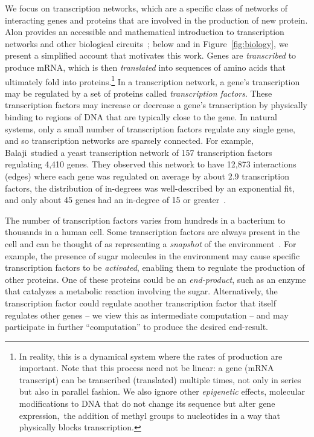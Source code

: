 \documentclass[11pt]{article}
\begin{document}
We focus on transcription networks, which are a specific class of networks of
interacting genes and proteins that are involved in the production of new
protein. Alon provides an accessible and mathematical introduction to
transcription networks and other biological circuits~\cite{Alon:2006}; below and
in Figure~\ref{fig:biology}, we present a simplified account that motivates this
work. Genes are \emph{transcribed} to produce mRNA, which is then
\emph{translated} into sequences of amino acids that ultimately fold into
proteins.\footnote{In reality, this is a dynamical system where the rates of
production are important. Note that this process need not be linear: a gene (mRNA
transcript) can be transcribed (translated) multiple times, not only in series
but also in parallel fashion.  We also ignore
other \emph{epigenetic} effects, \ie molecular modifications to DNA that do not
change its sequence but alter gene expression,~\eg the addition of methyl groups
to nucleotides in a way that physically blocks transcription.}
In a transcription network, a gene's transcription may be regulated by a set of
proteins called \emph{transcription factors}.
These transcription factors may increase or decrease a gene's transcription by
physically binding to regions of DNA that are typically close to the gene.
In natural systems, only a small number of transcription factors
regulate any single gene, and so transcription networks are sparsely connected.
For example, Balaji~\etal studied a yeast
transcription network of 157 transcription factors regulating 4,410 genes. They
observed this network to have 12,873 interactions (edges) where each gene was
regulated on average by about 2.9 transcription factors, the distribution of
in-degrees was well-described by an exponential fit, and only about 45 genes had
an in-degree of 15 or greater~\cite{Balaji:2006}.

The number of transcription factors varies from hundreds in a bacterium to
thousands in a human cell. Some transcription factors are always present in the
cell and can be thought of as representing a \emph{snapshot} of the
environment~\cite{Alon:2006}.
For example, the presence of sugar molecules in the environment may cause
specific transcription factors to be \emph{activated}, enabling them to regulate
the production of other proteins.  One of these proteins could be an
\emph{end-product}, such as an enzyme that catalyzes a metabolic reaction
involving the sugar. Alternatively, the transcription factor could regulate
another transcription factor that itself
regulates other genes -- we view this as intermediate computation -- and may
participate in further ``computation'' to produce the desired end-result.
\end{document}
